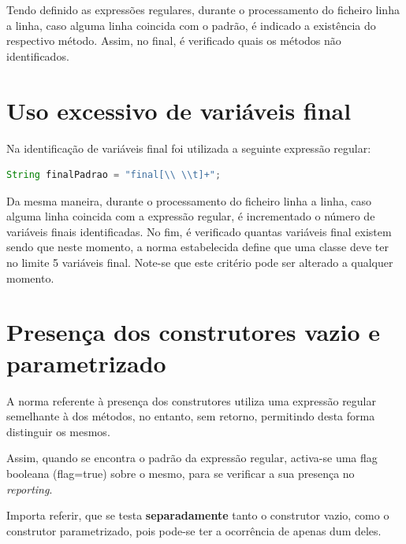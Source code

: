 \par Tendo definido as expressões regulares, durante o processamento do ficheiro linha a linha, caso alguma linha coincida com o padrão, é indicado a existência do respectivo método. Assim, no final, é verificado quais os métodos não identificados.

\section{Uso excessivo de variáveis final}

\par Na identificação de variáveis final foi utilizada a seguinte expressão regular:

\begin{lstlisting}[language=Java] 
String finalPadrao = "final[\\ \\t]+";
\end{lstlisting}

\par Da mesma maneira, durante o processamento do ficheiro linha a linha, caso alguma linha coincida com a expressão regular, é incrementado o número de variáveis finais identificadas. No fim, é verificado quantas variáveis final existem sendo que neste momento, a norma estabelecida define que uma classe deve ter no limite 5 variáveis final. Note-se que este critério pode ser alterado a qualquer momento.

\section{Presença dos construtores vazio e parametrizado}
\hspace{5mm} A norma referente à presença dos construtores utiliza uma expressão regular semelhante à dos métodos, no entanto, sem retorno, permitindo desta forma distinguir os mesmos. 

Assim, quando se encontra o padrão da expressão regular, activa-se uma flag booleana (flag=true) sobre o mesmo, para se verificar a sua presença no \textit{reporting}. 

Importa referir, que se testa \textbf{separadamente} tanto o construtor vazio, como o construtor parametrizado, pois pode-se ter a ocorrência de apenas dum deles.

